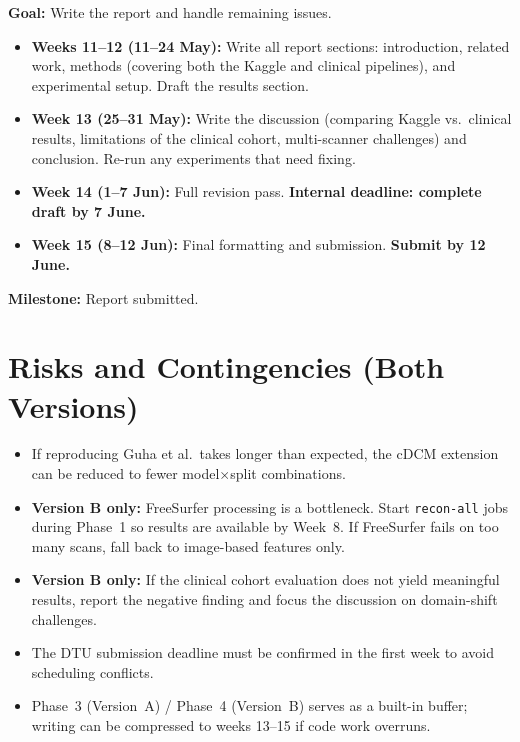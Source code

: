 \documentclass[a4paper,11pt]{article}
\begin{document}
\textbf{Goal:} Write the report and handle remaining issues.

\begin{itemize}[leftmargin=*]
    \item \textbf{Weeks 11--12 (11--24 May):}
    Write all report sections: introduction, related work, methods (covering both the Kaggle and clinical pipelines), and experimental setup.
    Draft the results section.

    \item \textbf{Week 13 (25--31 May):}
    Write the discussion (comparing Kaggle vs.\ clinical results, limitations of the clinical cohort, multi-scanner challenges) and conclusion.
    Re-run any experiments that need fixing.

    \item \textbf{Week 14 (1--7 Jun):}
    Full revision pass.
    \textbf{Internal deadline: complete draft by 7 June.}

    \item \textbf{Week 15 (8--12 Jun):}
    Final formatting and submission.
    \textbf{Submit by 12 June.}
\end{itemize}

\noindent\textbf{Milestone:} Report submitted.


\section*{Risks and Contingencies (Both Versions)}

\begin{itemize}[leftmargin=*]
    \item If reproducing Guha et al.\ takes longer than expected, the cDCM extension can be reduced to fewer model$\times$split combinations.
    \item \textbf{Version B only:} FreeSurfer processing is a bottleneck. Start \texttt{recon-all} jobs during Phase~1 so results are available by Week~8. If FreeSurfer fails on too many scans, fall back to image-based features only.
    \item \textbf{Version B only:} If the clinical cohort evaluation does not yield meaningful results, report the negative finding and focus the discussion on domain-shift challenges.
    \item The DTU submission deadline must be confirmed in the first week to avoid scheduling conflicts.
    \item Phase~3 (Version~A) / Phase~4 (Version~B) serves as a built-in buffer; writing can be compressed to weeks 13--15 if code work overruns.
\end{itemize}
\end{document}
